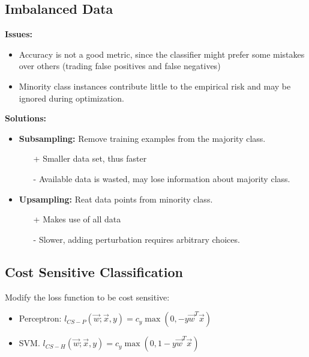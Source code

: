 \documentclass[8pt,a4paper]{scrartcl}
\begin{document}
\begin{multicols*}{3}

\subsection{Imbalanced Data}

\textbf{Issues:}
\begin{itemize}
\ncompaq
\item Accuracy is not a good metric, since the classifier might prefer some mistakes over others (trading false positives and false negatives)
\item Minority class instances contribute little to the empirical risk and may be ignored during optimization.
\end{itemize}

\textbf{Solutions:}
\begin{itemize}
\ncompaq
\item \textbf{Subsampling:} Remove training examples from the majority class.
\begin{itemize}
\ncompaq
\item[+] Smaller data set, thus faster
\item[-] Available data is wasted, may lose information about majority class.
\end{itemize}
\item \textbf{Upsampling:} Reat data points from minority class.
\begin{itemize}
\ncompaq
\item[+] Makes use of all data
\item[-] Slower, adding perturbation requires arbitrary choices.
\end{itemize}
\end{itemize}

\subsection{Cost Sensitive Classification}

Modify the loss function to be cost sensitive:

\begin{itemize}
\ncompaq
\item Perceptron: $l_{CS-P}(\vec{w};\vec{x},y)=c_y \max(0,-y\vec{w}^T\vec{x})$
\item SVM. $l_{CS-H}(\vec{w};\vec{x},y)=c_y\max(0,1-y\vec{w}^T\vec{x})$
\end{itemize}


\end{multicols*}
\end{document}
